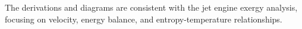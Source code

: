 The derivations and diagrams are consistent with the jet engine exergy analysis, focusing on velocity, energy balance, and entropy-temperature relationships.